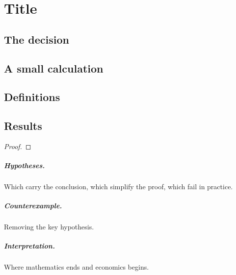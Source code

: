 \chapter{Title}\label{ch:N}


\section{The decision}
\section{A small calculation}

\section{Definitions}
\begin{definition}[Name]\end{definition}
\begin{example}\end{example}
\begin{remark}\end{remark}

\section{Results}
\begin{theorem}\label{thm:chN-main}\end{theorem}
\begin{proof}\end{proof}
\paragraph{Hypotheses.} Which carry the conclusion, which simplify the proof, which fail in practice.
\paragraph{Counterexample.} Removing the key hypothesis.
\paragraph{Interpretation.} Where mathematics ends and economics begins.

